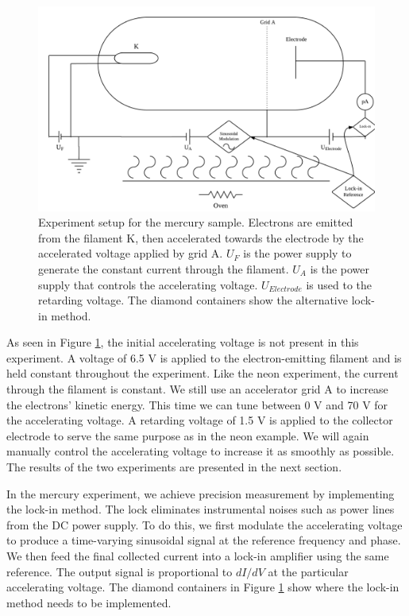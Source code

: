 \documentclass[prb,preprint]{revtex4-1}
\begin{document}
\begin{figure}
    \centering
    \includegraphics[width=\textwidth]{fighg.png}
    \caption{Experiment setup for the mercury sample. Electrons are emitted from the filament K, then accelerated towards the electrode by the accelerated voltage applied by grid A. $U_F$ is the power supply to generate the constant current through the filament. $U_A$ is the power supply that controls the accelerating voltage. $U_{Electrode}$ is used to the retarding voltage. The diamond containers show the alternative lock-in method.}
    \label{fighg}
    \end{figure}

As seen in Figure \ref{fighg}, the initial accelerating voltage is not present in this experiment. A voltage of 6.5 V is applied to the electron-emitting filament and is held constant throughout the experiment. Like the neon experiment, the current through the filament is constant. We still use an accelerator grid A to increase the electrons' kinetic energy. This time we can tune between 0 V and 70 V for the accelerating voltage. A retarding voltage of 1.5 V is applied to the collector electrode to serve the same purpose as in the neon example. We will again manually control the accelerating voltage to increase it as smoothly as possible. The results of the two experiments are presented in the next section.

In the mercury experiment, we achieve precision measurement by implementing the lock-in method. The lock eliminates instrumental noises such as power lines from the DC power supply. To do this, we first modulate the accelerating voltage to produce a time-varying sinusoidal signal at the reference frequency and phase. We then feed the final collected current into a lock-in amplifier using the same reference. The output signal is proportional to $dI/dV$ at the particular accelerating voltage. The diamond containers in Figure \ref{fighg} show where the lock-in method needs to be implemented.
\end{document}
